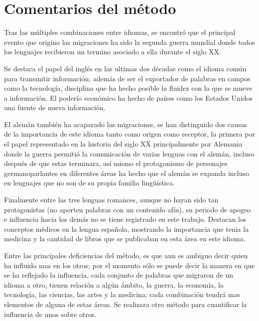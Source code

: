 \hfill\break
\hfill\break

\section{Comentarios del método}%


Tras las múltiples combinaciones entre idiomas, se  encontró que el principal
evento que origino las migraciones ha sido la segunda guerra mundial donde
todos los lenguajes recibieron un termino asociado a ella durante el siglo XX.

Se destaca el papel del inglés en las ultimas dos décadas como el idioma común
para transmitir información; además de ser el exportador de palabras en campos
como la tecnología, disciplina que ha hecho posible la fluidez con la que se
mueve a información. El poderío económico ha hecho de países como los Estados
Unidos una fuente de nueva información.

El alemán también ha acaparado las migraciones, se han distinguido dos causas
de la importancia de este idioma tanto como origen como receptor, la primera
por el papel representado en la historia del siglo XX principalmente por
Alemania donde la guerra permitió la comunicación de varias lenguas con el
alemán, incluso después de que estas terminara, así mismo el protagonismo de
personajes germanoparlantes en diferentes áreas ha hecho que el alemán se
expanda incluso en lenguajes que no son de su propia familia lingüística. 

Finalmente entre las tres lenguas romances, aunque no hayan sido tan
protagonistas (no aporten palabras con un contenido afín),  su periodo de
apogeo e influencia hacia los demás no se tiene registrado en este trabajo.
Destacan los conceptos médicos en la lengua española, mostrando la importancia
que tenia la medicina y la cantidad de libros que se publicaban en esta área en
este idioma. 

Entre las principales deficiencias del método, es que aun es ambiguo decir
quien ha influido mas en los otros; por el momento sólo se puede decir la
manera en que se ha reflejado la influencia, cada conjunto de palabras que
migraron de un idioma a otro, tienen relación a algún ámbito, la guerra, la
economía, la tecnología, las ciencias, las artes y la medicina; cada
combinación tendrá mas elementos de alguna de estas áreas.  Se realizara otro
método para cuantificar la influencia de unos sobre otros. 


